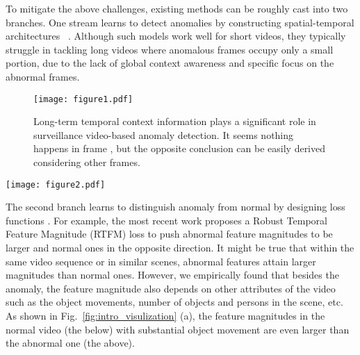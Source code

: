 \documentclass[letterpaper]{article} \usepackage{aaai23}  \usepackage{times}  \usepackage{helvet}  \usepackage{courier}  \usepackage[hyphens]{url}  \usepackage{graphicx} \urlstyle{rm} \def\UrlFont{\rm}  \usepackage{natbib}  \usepackage{caption} \frenchspacing  \setlength{\pdfpagewidth}{8.5in}  \setlength{\pdfpageheight}{11in}  \usepackage{algorithm}
\begin{document}
To mitigate the above challenges, existing methods can be roughly cast into two branches. One stream learns to detect anomalies by constructing spatial-temporal architectures ~\cite{MIST,motion-aware,RTFM,Not-only-look,LCTR}. Although such models work well for short videos, they typically struggle in tackling long videos where  anomalous frames occupy only a small portion, due to the lack of global context awareness and specific focus on the abnormal frames. 

\begin{figure}[!t]
\centering
\texttt{[image: figure1.pdf]}
\vspace{-6mm}
\caption{Long-term temporal context information plays a significant role in surveillance video-based anomaly detection. It seems nothing happens in frame , but the opposite conclusion can be easily derived considering other frames. }
\vspace{-3mm}
\label{fig:suvideo}
\end{figure}


\begin{figure*}[!t]
\centering
\texttt{[image: figure2.pdf]}
\vspace*{-2mm}
\caption{(a) With RTFM loss \cite{RTFM}, normal feature magnitudes can be larger than abnormal ones due to the various scene attributes. (b) Our MC loss can generate more consistent feature magnitudes with anomalies. (c) Based on 100 random samples, our MC loss achieves the better separability of normal and abnormal features. }
\vspace*{-3mm}
\label{fig:intro_visulization}
\end{figure*}

The second branch learns to distinguish anomaly from normal by designing loss functions \cite{RTFM,cleaning-label,MIST,claws}. 
For example, the most recent work \cite{RTFM} proposes a Robust Temporal Feature Magnitude (RTFM) loss to push abnormal feature magnitudes to be larger and normal ones in the opposite direction. It might be true that within the same video sequence or in similar scenes, abnormal features attain larger magnitudes than normal ones. 
However, we empirically found that besides the anomaly, the feature magnitude also depends on other attributes of the video such as the object movements, number of objects and persons in the scene, etc. As shown in Fig.~\ref{fig:intro_visulization} (a), the feature magnitudes in the normal video (the below) with substantial object movement are even larger than the abnormal one (the above). 
\end{document}
